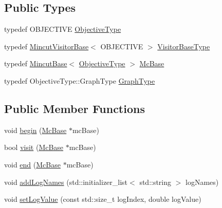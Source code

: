 \subsection*{Public Types}
\begin{DoxyCompactItemize}
\item 
typedef O\+B\+J\+E\+C\+T\+I\+VE \hyperlink{classnifty_1_1graph_1_1opt_1_1mincut_1_1PyMincutVisitorBase_a2b620db205e661bd3dedede448cb8ca6}{Objective\+Type}
\item 
typedef \hyperlink{namespacenifty_1_1graph_1_1opt_1_1mincut_af5f9546254de453f964641e936ad8ba3}{Mincut\+Visitor\+Base}$<$ O\+B\+J\+E\+C\+T\+I\+VE $>$ \hyperlink{classnifty_1_1graph_1_1opt_1_1mincut_1_1PyMincutVisitorBase_af4e0e98d9d903d41f506563262ef8fbe}{Visitor\+Base\+Type}
\item 
typedef \hyperlink{classnifty_1_1graph_1_1opt_1_1mincut_1_1MincutBase}{Mincut\+Base}$<$ \hyperlink{classnifty_1_1graph_1_1opt_1_1mincut_1_1PyMincutVisitorBase_a2b620db205e661bd3dedede448cb8ca6}{Objective\+Type} $>$ \hyperlink{classnifty_1_1graph_1_1opt_1_1mincut_1_1PyMincutVisitorBase_affe563abecb7aced8bf1b0a273bf61b1}{Mc\+Base}
\item 
typedef Objective\+Type\+::\+Graph\+Type \hyperlink{classnifty_1_1graph_1_1opt_1_1mincut_1_1PyMincutVisitorBase_a0538023e7fea2fb064c0526687a923fa}{Graph\+Type}
\end{DoxyCompactItemize}
\subsection*{Public Member Functions}
\begin{DoxyCompactItemize}
\item 
void \hyperlink{classnifty_1_1graph_1_1opt_1_1mincut_1_1PyMincutVisitorBase_a92bcd3baab1b60f3c50e9e8723b0b562}{begin} (\hyperlink{classnifty_1_1graph_1_1opt_1_1mincut_1_1PyMincutVisitorBase_affe563abecb7aced8bf1b0a273bf61b1}{Mc\+Base} $\ast$mc\+Base)
\item 
bool \hyperlink{classnifty_1_1graph_1_1opt_1_1mincut_1_1PyMincutVisitorBase_a40a323a9b5748e162043d516954e940c}{visit} (\hyperlink{classnifty_1_1graph_1_1opt_1_1mincut_1_1PyMincutVisitorBase_affe563abecb7aced8bf1b0a273bf61b1}{Mc\+Base} $\ast$mc\+Base)
\item 
void \hyperlink{classnifty_1_1graph_1_1opt_1_1mincut_1_1PyMincutVisitorBase_abf805fce00cd02f6721ee7825e2510a9}{end} (\hyperlink{classnifty_1_1graph_1_1opt_1_1mincut_1_1PyMincutVisitorBase_affe563abecb7aced8bf1b0a273bf61b1}{Mc\+Base} $\ast$mc\+Base)
\item 
void \hyperlink{classnifty_1_1graph_1_1opt_1_1mincut_1_1PyMincutVisitorBase_a99c335cf50430f381e66e826f6805e5b}{add\+Log\+Names} (std\+::initializer\+\_\+list$<$ std\+::string $>$ log\+Names)
\item 
void \hyperlink{classnifty_1_1graph_1_1opt_1_1mincut_1_1PyMincutVisitorBase_a3c2aa40745b7853704fee9a77625dc8d}{set\+Log\+Value} (const std\+::size\+\_\+t log\+Index, double log\+Value)
\end{DoxyCompactItemize}


